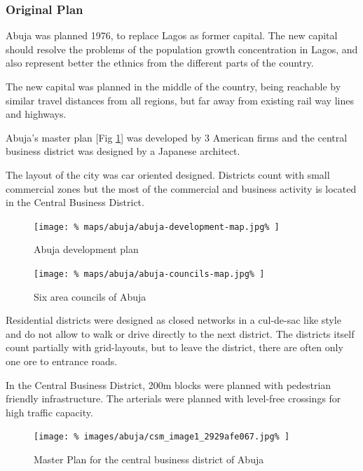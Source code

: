 \documentclass{article}
\begin{document}
	\begin{multicols}{2}		
		\raggedcolumns
				
			\subsubsection{Original Plan}			
			Abuja was planned 1976, to replace Lagos as former capital.
			The new capital should resolve the problems of the population growth concentration in Lagos, and also represent better the ethnics from the different parts of the country.			
			
			The new capital was planned in the middle of the country, being reachable by similar travel distances from all regions, but far away from existing rail way lines and highways.
			
			Abuja's master plan [Fig \ref{fig:map:abuja-development-plan}] was developed by 3 American firms and the central business district was designed by a Japanese architect.
			
			The layout of the city was car oriented designed. Districts count with small commercial zones but the most of the commercial and business activity is located in the Central Business District.
			
			\begin{figure}[H]
				\texttt{[image: \%
					maps/abuja/abuja-development-map.jpg\%
				]}
				\caption{Abuja development plan  \cite{NairalandForum:AbujaMap}}
				\label{fig:map:abuja-development-plan}
			\end{figure}
			
			\begin{figure}[H]
				\texttt{[image: \%
					maps/abuja/abuja-councils-map.jpg\%
				]}
				\caption{Six area councils of Abuja  \cite{ResearchGate:SixCouncils}}
				\label{fig:map:abuja-six-area-councils}
			\end{figure}
			
			Residential districts were designed as closed networks in a cul-de-sac like style and do not allow to walk or drive directly to the next district. The districts itself count partially with grid-layouts, but to leave the district, there are often only one ore to entrance roads.
			
			In the Central Business District, 200m blocks were planned with pedestrian friendly infrastructure.
			The arterials were planned with level-free crossings for high traffic capacity.
			
			\begin{figure}[H]
				\texttt{[image: \%
					images/abuja/csm\_image1\_2929afe067.jpg\%
				]}
				\caption{Master Plan for the central business district of Abuja \cite{ASplusP:MasterPlanReview}}
				\label{fig:map:abuja-master-plan-cbd}
			\end{figure}	
			

\end{multicols}
\end{document}
